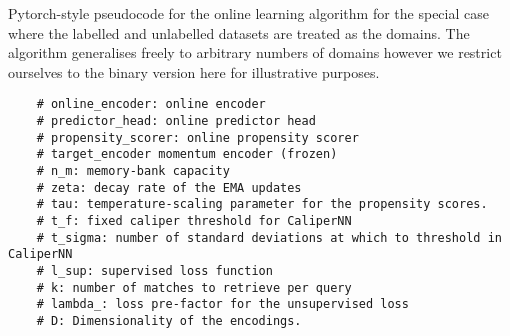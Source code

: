 \begin{algorithm}[ht]
     \caption{
         Pytorch-style pseudocode for the online learning algorithm for the special case where the
         labelled and unlabelled datasets are treated as the domains. The algorithm generalises
         freely to arbitrary numbers of domains however we restrict ourselves to the binary version
         here for illustrative purposes.
    }
    \label{alg:ol_pc}
    \begin{verbatim}
    # online_encoder: online encoder
    # predictor_head: online predictor head
    # propensity_scorer: online propensity scorer
    # target_encoder momentum encoder (frozen)
    # n_m: memory-bank capacity
    # zeta: decay rate of the EMA updates
    # tau: temperature-scaling parameter for the propensity scores.
    # t_f: fixed caliper threshold for CaliperNN
    # t_sigma: number of standard deviations at which to threshold in CaliperNN
    # l_sup: supervised loss function
    # k: number of matches to retrieve per query
    # lambda_: loss pre-factor for the unsupervised loss
    # D: Dimensionality of the encodings.


\end{verbatim}
\end{algorithm}
